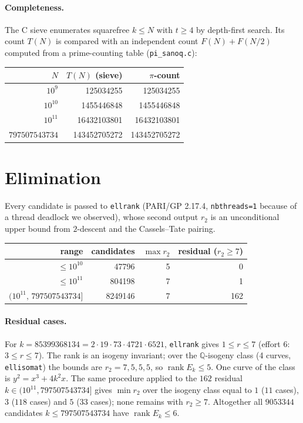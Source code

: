 \documentclass[11pt]{amsart}
\theoremstyle{remark}\newtheorem{remark}[theorem]{Remark}
\begin{document}
\paragraph{Completeness.} The C sieve enumerates squarefree $k\le N$ with $t\ge4$ by depth-first search. Its count $T(N)$ is
compared with an independent count $F(N)+F(N/2)$ computed from a prime-counting table (\texttt{pi\_sanoq.c}):
\begin{center}\begin{tabular}{rrr}\toprule
$N$ & $T(N)$ (sieve) & $\pi$-count\\\midrule
$10^{9}$ & 125034255 & 125034255\\
$10^{10}$ & 1455446848 & 1455446848\\
$10^{11}$ & 16432103801 & 16432103801\\
$797507543734$ & 143452705272 & 143452705272\\\bottomrule
\end{tabular}\end{center}

\section{Elimination}
Every candidate is passed to \texttt{ellrank} (PARI/GP 2.17.4, \texttt{nbthreads=1} because of a thread deadlock we observed),
whose second output $r_2$ is an unconditional upper bound from $2$-descent and the Cassels--Tate pairing.
\begin{center}\begin{tabular}{rrrr}\toprule
range & candidates & $\max r_2$ & residual ($r_2\ge7$)\\\midrule
$\le10^{10}$ & 47796 & 5 & 0\\
$\le10^{11}$ & 804198 & 7 & 1\\
$(10^{11},\,797507543734]$ & 8249146 & 7 & 162\\\bottomrule
\end{tabular}\end{center}

\paragraph{Residual cases.} For $k=85399368134=2\cdot19\cdot73\cdot4721\cdot6521$, \texttt{ellrank} gives $1\le r\le 7$
(effort $6$: $3\le r\le7$). The rank is an isogeny invariant; over the $\mathbb Q$-isogeny class (4 curves, \texttt{ellisomat})
the bounds are $r_2=7,5,5,5$, so $\operatorname{rank}E_k\le5$. One curve of the class is $y^2=x^3+4k^2x$.
The same procedure applied to the $162$ residual $k\in(10^{11},797507543734]$ gives $\min r_2$ over the isogeny class
equal to $1$ ($11$ cases), $3$ ($118$ cases) and $5$ ($33$ cases); none remains with $r_2\ge7$.
Altogether all $9053344$ candidates $k\le797507543734$ have $\operatorname{rank}E_k\le6$.
\end{document}
